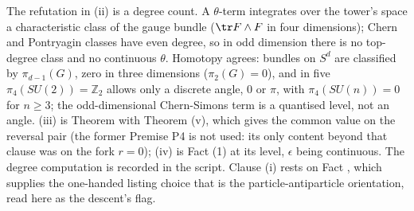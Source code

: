 The refutation in (ii) is a degree count. A $\theta$-term integrates over the tower's space a characteristic class of the gauge bundle ($\tr F \wedge F$ in four dimensions); Chern and Pontryagin classes have even degree, so in odd dimension there is no top-degree class and no continuous $\theta$. Homotopy agrees: bundles on $S^{d}$ are classified by $\pi_{d-1}(G)$, zero in three dimensions ($\pi_{2}(G) = 0$), and in five $\pi_{4}(SU(2)) = \mathbb{Z}_{2}$ allows only a discrete angle, $0$ or $\pi$, with $\pi_{4}(SU(n)) = 0$ for $n \geq 3$; the odd-dimensional Chern-Simons term is a quantised level, not an angle. (iii) is Theorem  with Theorem (v), which gives the common value on the reversal pair (the former Premise P4 is not used: its only content beyond that clause was on the fork $r = 0$); (iv) is Fact (1) at its level, $\epsilon$ being continuous. The degree computation is recorded in the script. Clause (i) rests on Fact , which supplies the one-handed listing choice that is the particle-antiparticle orientation, read here as the descent's flag.
